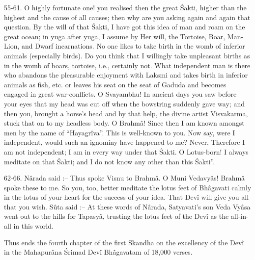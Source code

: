 55-61. O highly fortunate one! you realised then the great \'Sakti, higher than the highest and the cause of all causes; then why are you asking again and again that question. By the will of that \'Sakti, I have got this idea of man and roam on the great ocean; in yuga after yuga, I assume by Her will, the Tortoise, Boar, Man-Lion, and Dwarf incarnations. No one likes to take birth in the womb of inferior animals (especially birds). Do you think that I willingly take unpleasant births as in the womb of boars, tortoise, i.e., certainly not. What independent man is there who abandons the pleasurable enjoyment with Laksmi and takes birth in inferior animals as fish, etc. or leaves his seat on the seat of Gaduda and becomes engaged in great war-conflicts. O Svayambhu! In ancient days you saw before your eyes that my head was cut off when the bowstring suddenly gave way; and then you, brought a horse's head and by that help, the divine artist Visvakarma, stuck that on to my headless body. O Brahm\^a! Since then I am known amongst men by the name of  ``Hayagr\^iva''. This is well-known to you. Now say, were I independent, would such an ignominy have happened to me? Never. Therefore I am not independent; I am in every way under that \'Sakti. O Lotus-born! I always meditate on that \'Sakti; and I do not know any other than this \'Sakti''.

62-66. N\^arada said :-- Thus spoke Visnu to Brahm\^a. O Muni Vedavy\^as! Brahm\^a spoke these to me. So you, too, better meditate the lotus feet of Bh\^agavati calmly in the lotus of your heart for the success of your idea. That Dev\^i will give you all that you wish. S\^uta said :-- At these words of N\^arada, Satyavati's son Veda Vy\^asa went out to the hills for Tapasy\^a, trusting the lotus feet of the Dev\^i as the all-in-all in this world.

Thus ends the fourth chapter of the first Skandha on the excellency of the Dev\^i in the Mahapur\^ana \'Srimad Dev\^i Bh\^agavatam of 18,000 verses.

